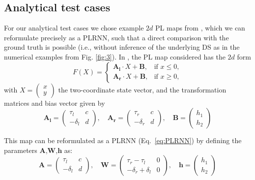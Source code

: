\documentclass{article}
\theoremstyle{example}
\theoremstyle{plain}
\theoremstyle{definition}
\theoremstyle{remark}
\def\eqref#1{equation~\ref{#1}}
\def\vh{{\bm{h}}}
\def\mA{{\bm{A}}}
\def\mW{{\bm{W}}}
\renewcommand{\eqref}[1]{Eq.~\ref{#1}}
\begin{document}
\subsection{Analytical test cases}
\label{app:analytical_test}
For our analytical test cases we chose example $2d$ PL maps from \cite{gardini2009connection}, which we can reformulate precisely as a PLRNN, such that a direct comparison with the ground truth is possible (i.e., without inference of the underlying DS as in the numerical examples from Fig. \ref{fig:3}).
In \cite{gardini2009connection}, the PL map considered has the $2d$ form
\begin{equation}
\label{eq-PL2d}
F(X) = 
\begin{cases} 
\boldsymbol{A_l} \cdot X + \boldsymbol{B}, & \text{if } x \leq 0, \\
\boldsymbol{A_r} \cdot X + \boldsymbol{B}, & \text{if } x \geq 0,
\end{cases}
\end{equation}
with \( X = \begin{pmatrix} x \\ y \end{pmatrix} \) the two-coordinate state vector, and the transformation matrices and bias vector given by
\[
\boldsymbol{A_l} = \begin{pmatrix} \tau_l & c \\ -\delta_l & d \end{pmatrix}, \quad
\boldsymbol{A_r} = \begin{pmatrix} \tau_r & c \\ -\delta_r & d \end{pmatrix}, \quad
\boldsymbol{B} = \begin{pmatrix} h_1 \\ h_2 \end{pmatrix}
\]

This map can be reformulated as a PLRNN (\eqref{eq:PLRNN}) by defining the parameters $\mA$,$\mW$,$\vh$ as:
\[
\mA = \begin{pmatrix} \tau_l & c \\ -\delta_l & d \end{pmatrix}, \quad \mW = \begin{pmatrix} \tau_r - \tau_l & 0 \\ -\delta_r + \delta_l & 0 \end{pmatrix}, \quad \vh = \begin{pmatrix} h_1 \\ h_2 \end{pmatrix}
\]
\end{document}
